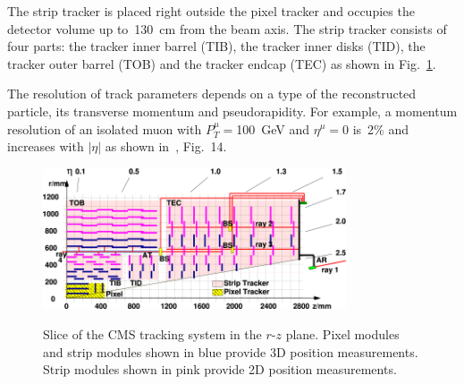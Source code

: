 
The strip tracker is placed right outside the pixel tracker and occupies the detector volume up to~130~cm from the beam axis. The strip tracker consists of four parts: the tracker inner barrel (TIB), the tracker inner disks (TID), the tracker outer barrel (TOB) and the tracker endcap (TEC) as shown in Fig.~\ref{fig:tracker_slice}. %

The resolution of track parameters depends on a type of the reconstructed particle, its transverse momentum and pseudorapidity. For example, a momentum resolution of an isolated muon with $P_T^{\mu}=$100~GeV and $\eta^{\mu}=$0 is~2\% and increases with $|\eta|$ as shown in~\cite{ref_trackerPerformance}, Fig.~14.  




\begin{figure}[htb]
  \begin{center}
    {\includegraphics[width=0.8\textwidth]{../figs/Exp/tracker_slice.png}}
    \caption{Slice of the CMS tracking system in the $r$-$z$ plane. Pixel modules and strip modules shown in blue provide 3D position measurements. Strip modules shown in pink provide 2D position measurements. }
    \label{fig:tracker_slice}
  \end{center}
\end{figure}

